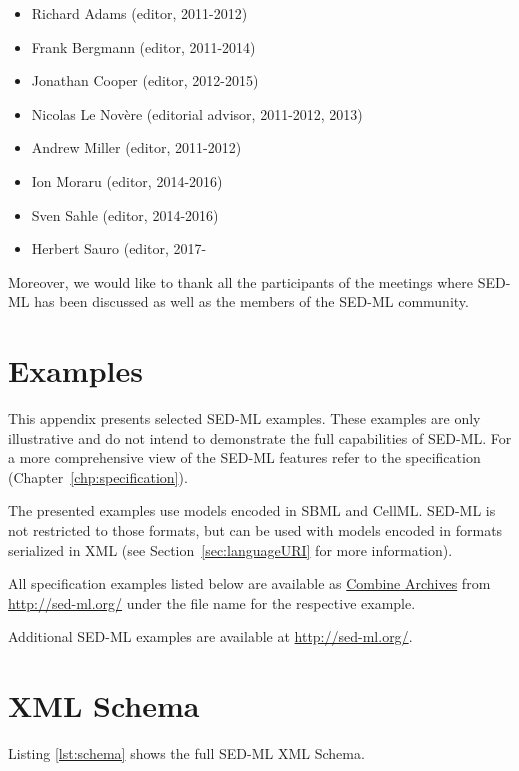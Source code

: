 \documentclass[pdftex,rgb,dvipsnames,svgnames,hyperref,table]{report}
\begin{document}
\begin{itemize}
\item Richard Adams (editor, 2011-2012)
\item Frank Bergmann (editor, 2011-2014)
\item Jonathan Cooper (editor, 2012-2015)
\item Nicolas Le Novère (editorial advisor, 2011-2012, 2013)
\item Andrew Miller (editor, 2011-2012)
\item Ion Moraru (editor, 2014-2016)
\item Sven Sahle (editor, 2014-2016)
\item Herbert Sauro (editor, 2017-
\end{itemize}

Moreover, we would like to thank all the participants of the meetings where SED-ML has been discussed as well as the members of the SED-ML community.

\appendix

\chapter{Examples}
\label{app:examples}
This appendix presents selected SED-ML examples. These examples are only illustrative and do not intend to demonstrate the full capabilities of SED-ML. For a more comprehensive view of the SED-ML features refer to the specification (Chapter~\ref{chp:specification}). 

The presented examples use models encoded in SBML and CellML. SED-ML is not restricted to those formats, but can be used with models encoded in formats serialized in XML (see Section~\ref{sec:languageURI} for more information).

All specification examples listed below are available as \hyperref[sec:archive]{Combine Archives} from \url{http://sed-ml.org/} under the  file name for the respective example. 

Additional SED-ML examples are available at \url{http://sed-ml.org/}.




\chapter{XML Schema}
\label{app:schema}
Listing \ref{lst:schema} shows the full SED-ML XML Schema.



\end{document}
